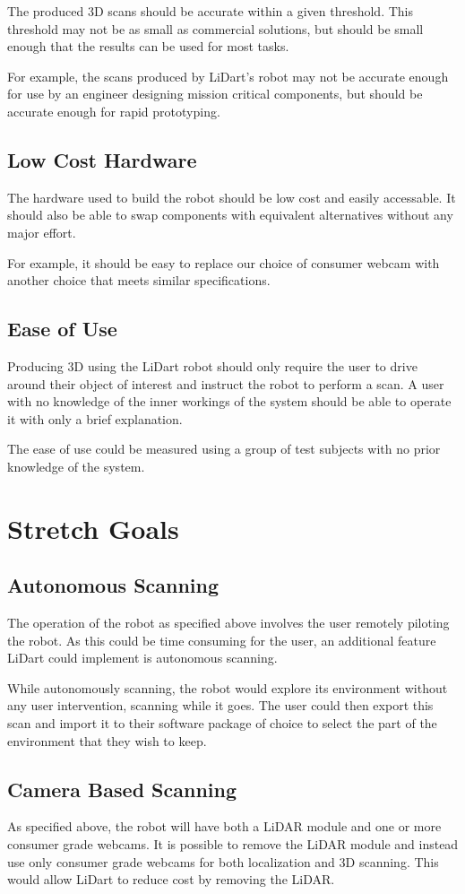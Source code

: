 \documentclass{article}
\begin{document}
The produced 3D scans should be accurate within a given threshold.
This threshold may not be as small as commercial solutions, but should
be small enough that the results can be used for most tasks.

For example, the scans produced by LiDart's robot may not be accurate enough
for use by an engineer designing mission critical components, but should
be accurate enough for rapid prototyping.

\subsection{Low Cost Hardware}

The hardware used to build the robot should be low cost and easily accessable.
It should also be able to swap components with equivalent alternatives
without any major effort.

For example, it should be easy to replace our choice of consumer webcam with another
choice that meets similar specifications.

\subsection{Ease of Use}

Producing 3D using the LiDart robot should only require the user to drive
around their object of interest and instruct the robot to perform a scan.
A user with no knowledge of the inner workings of the system should be able
to operate it with only a brief explanation. 

The ease of use could be measured using a group of test subjects with no
prior knowledge of the system.

\section{Stretch Goals}
\subsection{Autonomous Scanning}

The operation of the robot as specified above involves the user remotely
piloting the robot. As this could be time consuming for the user, an additional
feature LiDart could implement is autonomous scanning.

While autonomously scanning, the robot would explore its environment without
any user intervention, scanning while it goes. The user could then export this
scan and import it to their software package of choice to select the part of
the environment that they wish to keep.

\subsection{Camera Based Scanning}

As specified above, the robot will have both a LiDAR module and one
or more consumer grade webcams. It is possible to remove the LiDAR module
and instead use only consumer grade webcams for both localization and 3D scanning.
This would allow LiDart to reduce cost by removing the LiDAR.
\end{document}

